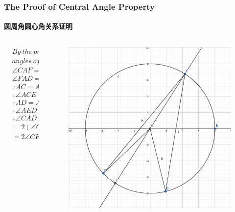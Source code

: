 \documentclass[
	11pt, %
]{beamer}
\begin{document}
\begin{frame}
\frametitle{The Proof of Central Angle Property}
\framesubtitle{圆周角圆心角关系证明}

\begin{columns}[t] 
		\begin{column}{0.4\textwidth} %
			\begin{equation*}
			\begin{aligned}
			&By\ the\ property\ of\ exterior\ \\&angles\ of\ triangles,\\
			&\angle CAF = \angle ACE + \angle CEA\\
			&\angle FAD = \angle AED + \angle ADE\\
			&\because AC = AE  = r\\
			&\therefore \angle ACE = \angle CEA\\
			&\because AD = AE  = r\\
			&\therefore \angle AED = \angle ADE\\
			&\therefore \angle CAD = \angle CAF + \angle FAD\\
			&= 2(\angle CEA + \angle AED)\\
			&= 2 \angle CED\ Q.E.D.
			\end{aligned}
			\end{equation*}
		\end{column}
		\begin{column}{0.6\textwidth} %
			\begin{figure}
				\includegraphics[width=\linewidth]{Proof_Central_Angle_Property.png}
			\end{figure}
		\end{column}
	\end{columns}
\end{frame}
\end{document}
